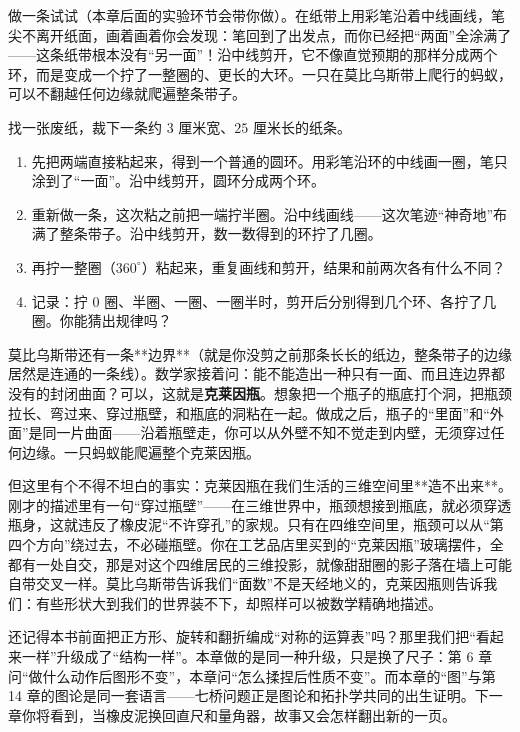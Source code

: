 做一条试试（本章后面的实验环节会带你做）。在纸带上用彩笔沿着中线画线，笔尖不离开纸面，画着画着你会发现：笔回到了出发点，而你已经把“两面”全涂满了——这条纸带根本没有“另一面”！沿中线剪开，它不像直觉预期的那样分成两个环，而是变成一个拧了一整圈的、更长的大环。一只在莫比乌斯带上爬行的蚂蚁，可以不翻越任何边缘就爬遍整条带子。

\begin{shiyan}
找一张废纸，裁下一条约 $3$ 厘米宽、$25$ 厘米长的纸条。
\begin{enumerate}
  \item 先把两端直接粘起来，得到一个普通的圆环。用彩笔沿环的中线画一圈，笔只涂到了“一面”。沿中线剪开，圆环分成两个环。
  \item 重新做一条，这次粘之前把一端拧半圈。沿中线画线——这次笔迹“神奇地”布满了整条带子。沿中线剪开，数一数得到的环拧了几圈。
  \item 再拧一整圈（$360^{\circ}$）粘起来，重复画线和剪开，结果和前两次各有什么不同？
  \item 记录：拧 $0$ 圈、半圈、一圈、一圈半时，剪开后分别得到几个环、各拧了几圈。你能猜出规律吗？
\end{enumerate}
\end{shiyan}

莫比乌斯带还有一条**边界**（就是你没剪之前那条长长的纸边，整条带子的边缘居然是连通的一条线）。数学家接着问：能不能造出一种只有一面、而且连边界都没有的封闭曲面？可以，这就是\textbf{克莱因瓶}。想象把一个瓶子的瓶底打个洞，把瓶颈拉长、弯过来、穿过瓶壁，和瓶底的洞粘在一起。做成之后，瓶子的“里面”和“外面”是同一片曲面——沿着瓶壁走，你可以从外壁不知不觉走到内壁，无须穿过任何边缘。一只蚂蚁能爬遍整个克莱因瓶。

但这里有个不得不坦白的事实：克莱因瓶在我们生活的三维空间里**造不出来**。刚才的描述里有一句“穿过瓶壁”——在三维世界中，瓶颈想接到瓶底，就必须穿透瓶身，这就违反了橡皮泥“不许穿孔”的家规。只有在四维空间里，瓶颈可以从“第四个方向”绕过去，不必碰瓶壁。你在工艺品店里买到的“克莱因瓶”玻璃摆件，全都有一处自交，那是对这个四维居民的三维投影，就像甜甜圈的影子落在墙上可能自带交叉一样。莫比乌斯带告诉我们“面数”不是天经地义的，克莱因瓶则告诉我们：有些形状大到我们的世界装不下，却照样可以被数学精确地描述。

\begin{lianjie}
还记得本书前面把正方形、旋转和翻折编成“对称的运算表”吗？那里我们把“看起来一样”升级成了“结构一样”。本章做的是同一种升级，只是换了尺子：第 6 章问“做什么动作后图形不变”，本章问“怎么揉捏后性质不变”。而本章的“图”与第 14 章的图论是同一套语言——七桥问题正是图论和拓扑学共同的出生证明。下一章你将看到，当橡皮泥换回直尺和量角器，故事又会怎样翻出新的一页。
\end{lianjie}


